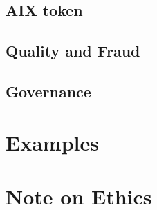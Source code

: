 \documentclass{article}
\begin{document}
\subsection{AIX token}

\subsection{Quality and Fraud}

\subsection{Governance}

\section{Examples}

\section{Note on Ethics}
\end{document}
